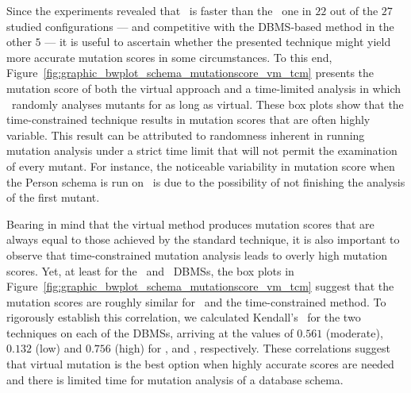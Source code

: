 


 Since the experiments revealed that \vma~is faster than the \Original~one in $22$ out of the $27$ studied configurations --- and competitive with the DBMS-based method in the other $5$ --- it is useful to ascertain whether the presented technique might yield more accurate mutation scores in some circumstances. To this end, Figure~\ref{fig:graphic_bwplot_schema_mutationscore_vm_tcm} presents the mutation score of both the virtual approach and a time-limited analysis in which \Original~randomly analyses mutants for as long as virtual. These box plots show that the time-constrained technique results in mutation scores that are often highly variable. This result can be attributed to randomness inherent in running mutation analysis under a strict time limit that will not permit the examination of every mutant. For instance, the noticeable variability in mutation score when the Person schema is run on \Postgres~is due to the possibility of not finishing the analysis of the first mutant.

Bearing in mind that the virtual method produces mutation scores that are always equal to those achieved by the standard technique, it is also important to observe that time-constrained mutation analysis leads to overly high mutation scores.  Yet, at least for the \HyperSQL~and \SQLite~DBMSs, the box plots in Figure~\ref{fig:graphic_bwplot_schema_mutationscore_vm_tcm} suggest that the mutation scores are roughly similar for \vma~and the time-constrained method. To rigorously establish this correlation, we calculated Kendall's \taub~for the two techniques on each of the DBMSs, arriving at the values of $0.561$ (moderate), $0.132$ (low) and $0.756$ (high) for \HyperSQL, \PostgreSQL and \sqlite, respectively. These correlations suggest that virtual mutation is the best option when highly accurate scores are needed and there is limited time for mutation analysis of a database schema.

